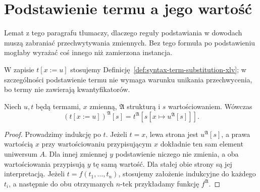 \section{Podstawienie termu a jego wartość}
Lemat z tego paragrafu tłumaczy, dlaczego reguły podstawiania w dowodach
muszą zabraniać przechwytywania zmiennych. Bez tego formuła
po podstawieniu mogłaby wyrażać coś innego niż zamierzona instancja.

W zapisie $t[x:=u]$ stosujemy
Definicję~\ref{def:syntax-term-substitution-xlv}; w szczególności
podstawienie termu nie wymaga warunku unikania przechwycenia,
bo termy nie zawierają kwantyfikatorów.

\begin{lemat}\label{lem:sem-term-subst}
Niech $u,t$ będą termami, $x$ zmienną, $\mathfrak A$ strukturą
i $s$ wartościowaniem. Wówczas
\[
(t[x:=u])^{\mathfrak A}[s]
=t^{\mathfrak A}[s[x\mapsto u^{\mathfrak A}[s]]].
\]
\end{lemat}
\begin{proof}
Prowadzimy indukcję po $t$. Jeżeli $t=x$, lewa strona jest
$u^{\mathfrak A}[s]$, a prawa wartością $x$ przy wartościowaniu
przypisującym $x$ dokładnie ten sam element uniwersum $A$.
Dla innej zmiennej $y$ podstawienie niczego nie zmienia,
a oba wartościowania przypisują $y$ tę samą wartość.
Dla stałej obie strony są jej interpretacją.
Jeżeli $t=f(t_1,\ldots,t_n)$, stosujemy założenie indukcyjne
do każdego $t_i$, a następnie do obu otrzymanych $n$-tek
przykładamy funkcję $f^{\mathfrak A}$.
\end{proof}


